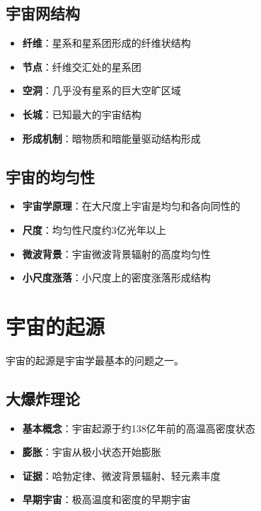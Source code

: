 \documentclass[12pt,UTF8]{ctexbook}
\begin{document}
\subsection{宇宙网结构}

\begin{itemize}
  \item \textbf{纤维}：星系和星系团形成的纤维状结构
  \item \textbf{节点}：纤维交汇处的星系团
  \item \textbf{空洞}：几乎没有星系的巨大空旷区域
  \item \textbf{长城}：已知最大的宇宙结构
  \item \textbf{形成机制}：暗物质和暗能量驱动结构形成
\end{itemize}

\subsection{宇宙的均匀性}

\begin{itemize}
  \item \textbf{宇宙学原理}：在大尺度上宇宙是均匀和各向同性的
  \item \textbf{尺度}：均匀性尺度约3亿光年以上
  \item \textbf{微波背景}：宇宙微波背景辐射的高度均匀性
  \item \textbf{小尺度涨落}：小尺度上的密度涨落形成结构
\end{itemize}

\section{宇宙的起源}

宇宙的起源是宇宙学最基本的问题之一。

\subsection{大爆炸理论}

\begin{itemize}
  \item \textbf{基本概念}：宇宙起源于约138亿年前的高温高密度状态
  \item \textbf{膨胀}：宇宙从极小状态开始膨胀
  \item \textbf{证据}：哈勃定律、微波背景辐射、轻元素丰度
  \item \textbf{早期宇宙}：极高温度和密度的早期宇宙
\end{itemize}
\end{document}

